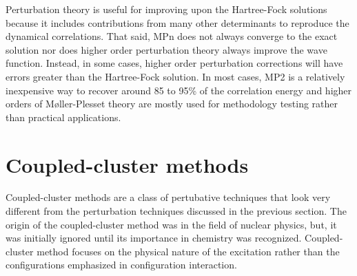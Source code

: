 \documentclass[11pt,oneside,final]{huthesis}%
\begin{document}
Perturbation theory is useful for improving upon the Hartree-Fock solutions because it includes contributions from many other determinants to reproduce the dynamical correlations.  That said, MPn does not always converge to the exact solution nor does higher order perturbation theory always improve the wave function.  Instead, in some cases, higher order perturbation corrections will have errors greater than the Hartree-Fock solution.   In most cases, MP2 is a relatively inexpensive way to recover around 85 to 95\% of the correlation energy and higher orders of M{\o}ller-Plesset theory are mostly used for methodology testing rather than practical applications.
 
\section{Coupled-cluster methods}

Coupled-cluster methods are a class of pertubative techniques that look very different from the perturbation techniques discussed in the previous section.  The origin of the coupled-cluster method was in the field of nuclear physics, but, it was initially ignored until its importance in chemistry was recognized.  Coupled-cluster method focuses on the physical nature of the excitation rather than the configurations emphasized in configuration interaction.

\end{document}
